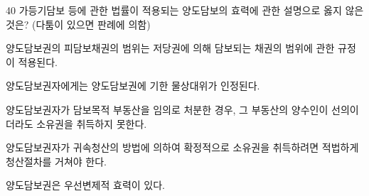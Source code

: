 \begin{question}{40}
가등기담보 등에 관한 법률이 적용되는 양도담보의 효력에 관한 설명으로 옳지 않은 것은? (다툼이 있으면 판례에 의함)
\begin{choices}
  \item 양도담보권의 피담보채권의 범위는 저당권에 의해 담보되는 채권의 범위에 관한 규정이 적용된다.
  \item 양도담보권자에게는 양도담보권에 기한 물상대위가 인정된다.
  \item 양도담보권자가 담보목적 부동산을 임의로 처분한 경우, 그 부동산의 양수인이 선의이더라도 소유권을 취득하지 못한다.
  \item 양도담보권자가 귀속청산의 방법에 의하여 확정적으로 소유권을 취득하려면 적법하게 청산절차를 거쳐야 한다.
  \item 양도담보권은 우선변제적 효력이 있다.
\end{choices}
\end{question}
